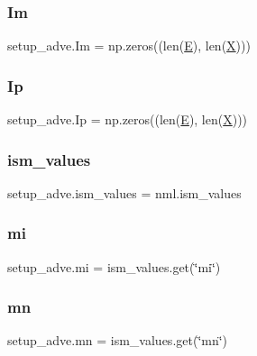 \subsubsection{\texorpdfstring{Im}{Im}}
{\footnotesize\ttfamily setup\+\_\+adve.\+Im = np.\+zeros((len(\hyperlink{namespacesetup__adve_a924af0e190ae028ed71b0d7b9dd75fed}{E}), len(\hyperlink{namespacesetup__adve_ac58005e2708a29ed334e0542dd68d336}{X})))}

\mbox{\label{namespacesetup__adve_ae453e6fb697be7b1aa425cd12ba5b170}} 
\subsubsection{\texorpdfstring{Ip}{Ip}}
{\footnotesize\ttfamily setup\+\_\+adve.\+Ip = np.\+zeros((len(\hyperlink{namespacesetup__adve_a924af0e190ae028ed71b0d7b9dd75fed}{E}), len(\hyperlink{namespacesetup__adve_ac58005e2708a29ed334e0542dd68d336}{X})))}

\mbox{\label{namespacesetup__adve_a7d8318ffb2cca573a4683c33a71197c2}} 
\subsubsection{\texorpdfstring{ism\+\_\+values}{ism\_values}}
{\footnotesize\ttfamily setup\+\_\+adve.\+ism\+\_\+values = nml.\+ism\+\_\+values}

\mbox{\label{namespacesetup__adve_a24f12e269f341eb38c7ba4c093877507}} 
\subsubsection{\texorpdfstring{mi}{mi}}
{\footnotesize\ttfamily setup\+\_\+adve.\+mi = ism\+\_\+values.\+get(\char`\"{}mi\char`\"{})}

\mbox{\label{namespacesetup__adve_a2daf92857dc5973a05d894becd3cc7ae}} 
\subsubsection{\texorpdfstring{mn}{mn}}
{\footnotesize\ttfamily setup\+\_\+adve.\+mn = ism\+\_\+values.\+get(\char`\"{}mn\char`\"{})}

